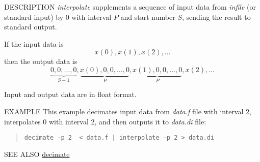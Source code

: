 \begin{synopsis}
\item[interpolate] [ --p $P$ ] [ --s $S$ ] [ {\em infile} ]
\end{synopsis}

\begin{qsection}{DESCRIPTION}
{\em interpolate} supplements a sequence of input data
from {\em infile} (or standard input)
by 0 with interval $P$ and start number $S$,
sending the result to standard output.

If the input data is
\begin{displaymath}
 x(0), x(1), x(2), \dots
\end{displaymath}
then the output data is
\begin{displaymath}
\underbrace{0, 0, \dots, 0}_{S-1},\underbrace{x(0), 0, 0, \dots, 0}_{P},\underbrace{x(1), 0, 0, \dots, 0}_{P},x(2), \dots
\end{displaymath}
\par
Input and output data are in float format.
\end{qsection}

\begin{options}
\end{options}

\begin{qsection}{EXAMPLE}
This example decimates input data from {\em data.f} file with interval 2,
interpolates 0 with interval 2, and then outputs it to {\em
data.di} file:
\begin{quote}
  \verb!decimate -p 2  < data.f | interpolate -p 2 > data.di!
\end{quote}
\end{qsection}

\begin{qsection}{SEE ALSO}
\hyperlink{decimate}{decimate}
\end{qsection}
